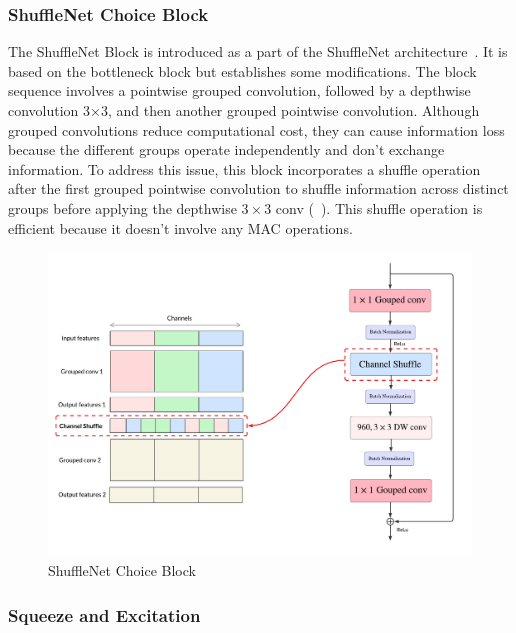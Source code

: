                     
    
        \subsubsection{ShuffleNet Choice Block}
        
            The ShuffleNet Block is introduced as a part of the ShuffleNet architecture~\cite{mobilenetv2}. It is based on the bottleneck block but establishes some modifications. The block sequence involves a pointwise grouped convolution, followed by a depthwise convolution 3×3, and then another grouped pointwise convolution. 
            Although grouped convolutions reduce computational cost, they can cause information loss because the different groups operate independently and don't exchange information. To address this issue, this block incorporates a shuffle operation after the first grouped pointwise convolution to shuffle information across distinct groups before applying the depthwise \(3\times3\) conv (~). This shuffle operation is efficient because it doesn't involve any MAC operations.

            \begin{figure}[hbt!]
                \begin{center}
                \includegraphics[width=.8\textwidth]{assets/images/shufflenet.png}
                \end{center}
                \caption{ShuffleNet Choice Block}%
                \label{fig:hw-nas:dl:shuffle}
            \end{figure}
            

        
        \subsubsection{Squeeze and Excitation}
        
